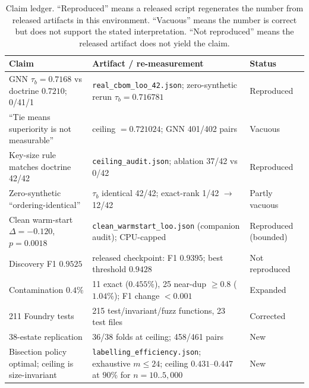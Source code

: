 \documentclass[conference,10pt]{IEEEtran}
\newcommand{\tb}{\tau_b}
\begin{document}
\begin{table}[t]
\centering
\caption{Claim ledger. ``Reproduced'' means a released script regenerates the number from
released artifacts in this environment. ``Vacuous'' means the number is correct but does not
support the stated interpretation. ``Not reproduced'' means the released artifact does not yield
the claim.}
\label{tab:ledger}
\footnotesize
\begin{tabular}{@{}p{2.15in}p{2.35in}p{0.95in}@{}}
\toprule
Claim & Artifact / re-measurement & Status \\
\midrule
GNN $\tb=0.7168$ vs doctrine $0.7210$; 0/41/1 & \texttt{real\_cbom\_loo\_42.json}; zero-synthetic rerun $\tb=0.716781$ & Reproduced \\
``Tie means superiority is not measurable'' & ceiling $=0.721024$; GNN 401/402 pairs & Vacuous \\
Key-size rule matches doctrine 42/42 & \texttt{ceiling\_audit.json}; ablation 37/42 vs 0/42 & Reproduced \\
Zero-synthetic ``ordering-identical'' & $\tb$ identical 42/42; exact-rank 1/42 $\rightarrow$ 12/42 & Partly vacuous \\
Clean warm-start $\Delta=-0.120$, $p=0.0018$ & \texttt{clean\_warmstart\_loo.json} (companion audit); CPU-capped & Reproduced (bounded) \\
Discovery F1 $0.9525$ & released checkpoint: F1 $0.9395$; best threshold $0.9428$ & Not reproduced \\
Contamination $0.4\%$ & 11 exact ($0.455\%$), 25 near-dup $\ge0.8$ ($1.04\%$); F1 change $<0.001$ & Expanded \\
211 Foundry tests & 215 test/invariant/fuzz functions, 23 test files & Corrected \\
38-estate replication & 36/38 folds at ceiling; 458/461 pairs & New \\
Bisection policy optimal; ceiling is size-invariant & \texttt{labelling\_efficiency.json}; exhaustive $m\le24$; ceiling $0.431$--$0.447$ at $90\%$ for $n=10..5{,}000$ & New \\
\bottomrule
\end{tabular}
\end{table}
\end{document}
